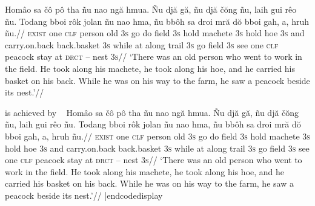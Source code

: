 \framedisplay
\ex[glhangstyle=cascade]
\let\\=\textsc
\begingl
\gla
Hom\^{a}o sa \v{c}\^{o} p\^{o} tha  \~{n}u nao ng\u{a} hmua. \~{N}u
dj\u{a} g\u{a}, \~{n}u dj\u{a} \v{c}\u{o}ng \~{n}u, laih gui r\^{e}o
\~{n}u. Todang bboi r\^{o}k jolan \~{n}u nao hma, \~{n}u bb\^{o}h sa
droi mr\u{a} d\u{o} bboi gah, a, hruh \~{n}u.//
\glb
\\{exist} one \\{clf} person old \\{3s} go do field \\{3s} hold
machete \\{3s} hold hoe \\{3s} and carry.on.back back.basket \\{3s}
while at along trail \\{3s} go field \\{3s} see one \\{clf} peacock
stay at \\{drct} -- nest \\{3s}//
\glft
`There was an old person who went to work in the field. He took
along his machete, he took along his hoe, and he carried his
basket on his back. While he was on his way to the farm, he saw a
peacock beside its nest.'//
\endgl
\xe
\endframedisplay

is achieved by
\codedisplay~
\ex[glhangstyle=cascade]
\let\\=\textsc
\begingl
\gla
Hom\^{a}o sa \v{c}\^{o} p\^{o} tha  \~{n}u nao ng\u{a} hmua. \~{N}u
dj\u{a} g\u{a}, \~{n}u dj\u{a} \v{c}\u{o}ng \~{n}u, laih gui r\^{e}o
\~{n}u. Todang bboi r\^{o}k jolan \~{n}u nao hma, \~{n}u bb\^{o}h sa
droi mr\u{a} d\u{o} bboi gah, a, hruh \~{n}u.//
\glb
\\{exist} one \\{clf} person old \\{3s} go do field \\{3s} hold
machete \\{3s} hold hoe \\{3s} and carry.on.back back.basket \\{3s}
while at along trail \\{3s} go field \\{3s} see one \\{clf} peacock
stay at \\{drct} -- nest \\{3s}//
\glft
`There was an old person who went to work in the field. He took
along his machete, he took along his hoe, and he carried his
basket on his back. While he was on his way to the farm, he saw a
peacock beside its nest.'//
\endgl
\xe
|endcodedisplay

